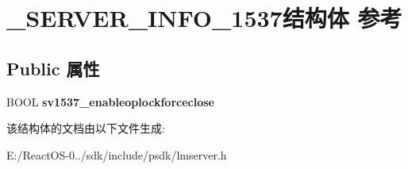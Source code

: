 \hypertarget{struct___s_e_r_v_e_r___i_n_f_o__1537}{}\section{\+\_\+\+S\+E\+R\+V\+E\+R\+\_\+\+I\+N\+F\+O\+\_\+1537结构体 参考}
\label{struct___s_e_r_v_e_r___i_n_f_o__1537}
\subsection*{Public 属性}
\begin{DoxyCompactItemize}
\item 
\mbox{\label{struct___s_e_r_v_e_r___i_n_f_o__1537_a31458ffa70e2dc8a75d6cb8d9ae31edf}} 
B\+O\+OL {\bfseries sv1537\+\_\+enableoplockforceclose}
\end{DoxyCompactItemize}


该结构体的文档由以下文件生成\+:\begin{DoxyCompactItemize}
\item 
E\+:/\+React\+O\+S-\/0../sdk/include/psdk/lmserver.\+h\end{DoxyCompactItemize}
